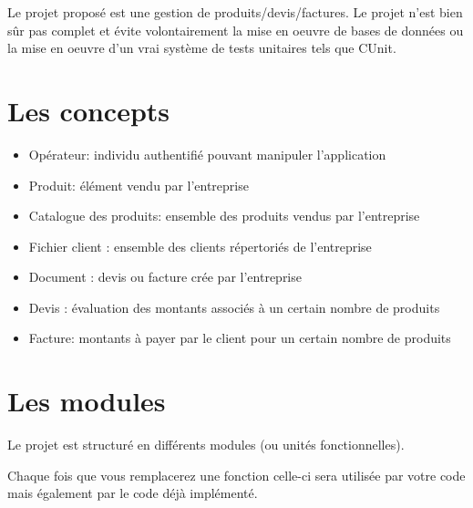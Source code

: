 Le projet proposé est une gestion de produits/devis/factures. Le projet n'est
bien sûr pas complet et évite volontairement la mise en oeuvre de bases de
données ou la mise en oeuvre d'un vrai système de tests unitaires tels que
CUnit.

\section{Les concepts}

\begin{itemize}
  \item Opérateur: individu authentifié pouvant manipuler l'application
  \item Produit: élément vendu par l'entreprise
  \item Catalogue des produits: ensemble des produits vendus par l'entreprise
  \item Fichier client : ensemble des clients répertoriés de l'entreprise
  \item Document : devis ou facture crée par l'entreprise
  \item Devis : évaluation des montants associés à un certain nombre de produits
  \item Facture: montants à payer par le client pour un certain nombre de
  produits
\end{itemize}

\section{Les modules}

Le projet est structuré en différents modules (ou unités fonctionnelles). 
\begin{warning}
Chaque fois que vous remplacerez une fonction celle-ci sera utilisée par votre code mais également par le code déjà implémenté. 
\end{warning}


 


